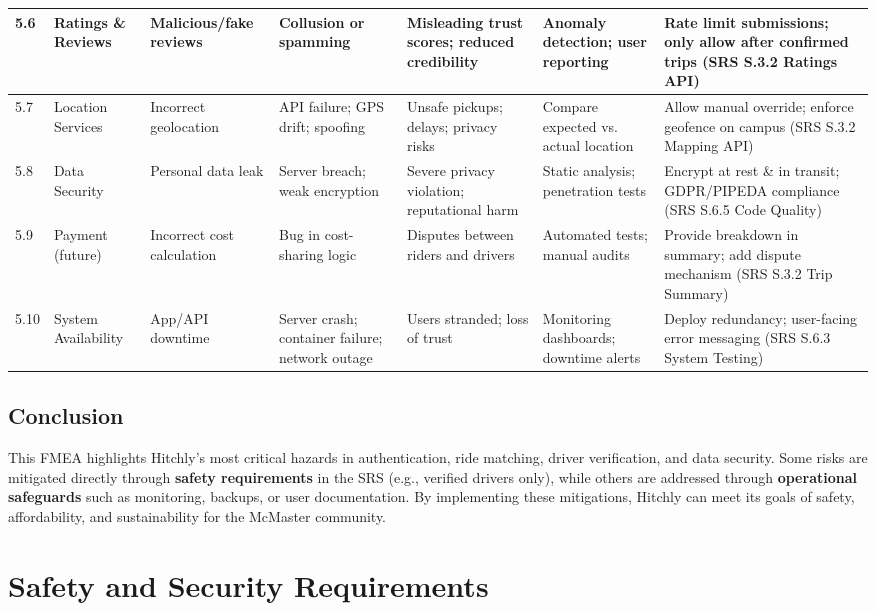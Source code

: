 \documentclass{article}
\begin{document}
\begin{longtable}{|p{0.5cm}|p{2cm}|p{2cm}|p{2cm}|p{2cm}|p{2cm}|p{2cm}|}
5.6 & Ratings \& Reviews & Malicious/fake reviews & Collusion or spamming & Misleading trust scores; reduced credibility & Anomaly detection; user reporting & Rate limit submissions; only allow after confirmed trips (SRS S.3.2 Ratings API) \\ \hline

5.7 & Location Services & Incorrect geolocation & API failure; GPS drift; spoofing & Unsafe pickups; delays; privacy risks & Compare expected vs. actual location & Allow manual override; enforce geofence on campus (SRS S.3.2 Mapping API) \\ \hline

5.8 & Data Security & Personal data leak & Server breach; weak encryption & Severe privacy violation; reputational harm & Static analysis; penetration tests & Encrypt at rest \& in transit; GDPR/PIPEDA compliance (SRS S.6.5 Code Quality) \\ \hline

5.9 & Payment (future) & Incorrect cost calculation & Bug in cost-sharing logic & Disputes between riders and drivers & Automated tests; manual audits & Provide breakdown in summary; add dispute mechanism (SRS S.3.2 Trip Summary) \\ \hline

5.10 & System Availability & App/API downtime & Server crash; container failure; network outage & Users stranded; loss of trust & Monitoring dashboards; downtime alerts & Deploy redundancy; user-facing error messaging (SRS S.6.3 System Testing) \\ \hline


\end{longtable}
\endgroup



\subsection{Conclusion}
This FMEA highlights Hitchly’s most critical hazards in authentication, ride matching,
driver verification, and data security. Some risks are mitigated directly through
\textbf{safety requirements} in the SRS (e.g., verified drivers only), while others are addressed
through \textbf{operational safeguards} such as monitoring, backups, or user documentation.
By implementing these mitigations, Hitchly can meet its goals of safety, affordability,
and sustainability for the McMaster community.

\section{Safety and Security Requirements}
\end{document}
